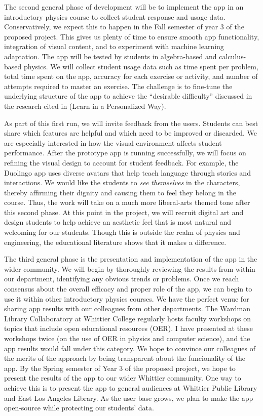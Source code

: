 \documentclass[11pt]{amsart}
\begin{document}
The second general phase of development will be to implement the app in an introductory physics course to collect student response and usage data.  Conservatively, we expect this to happen in the Fall semester of year 3 of the proposed project.  This gives us plenty of time to ensure smooth app functionality, integration of visual content, and to experiment with machine learning adaptation.  The app will be tested by students in algebra-based and calculus-based physics.  We will collect student usage data such as time spent per problem, total time spent on the app, accuracy for each exercise or activity, and number of attempts required to master an exercise.  The challenge is to fine-tune the underlying structure of the app to achieve the ``desirable difficulty'' discussed in the research cited in \cite{duolingo_whitepaper} (Learn in a Personalized Way).  

As part of this first run, we will invite feedback from the users.  Students can best share which features are helpful and which need to be improved or discarded.  We are especially interested in how the visual environment affects student performance.  After the prototype app is running successfully, we will focus on refining the visual design to account for student feedback.  For example, the Duolingo app uses diverse avatars that help teach language through stories and interactions.  We would like the students to \textit{see themselves} in the characters, thereby affirming their dignity and causing them to feel they belong in the course.  Thus, the work will take on a much more liberal-arts themed tone after this second phase.  At this point in the project, we will recruit digital art and design students to help achieve an aesthetic feel that is most natural and welcoming for our students.  Though this is outside the realm of physics and engineering, the educational literature shows that it makes a difference. 

The third general phase is the presentation and implementation of the app in the wider community.  We will begin by thoroughly reviewing the results from within our department, identifying any obvious trends or problems.  Once we reach consensus about the overall efficacy and proper role of the app, we can begin to use it within other introductory physics courses.  We have the perfect venue for sharing app results with our colleagues from other departments.  The Wardman Library Collaboratory at Whittier College regularly hosts faculty workshops on topics that include open educational resources (OER).  I have presented at these workshops twice (on the use of OER in physics and computer science), and the app results would fall under this category.  We hope to convince our colleagues of the merits of the approach by being transparent about the funcionality of the app.  By the Spring semester of Year 3 of the proposed project, we hope to present the results of the app to our wider Whittier community.  One way to achieve this is to present the app to general audiences at Whittier Public Library and East Los Angeles Library.  As the user base grows, we plan to make the app open-source while protecting our students' data.
\end{document}
